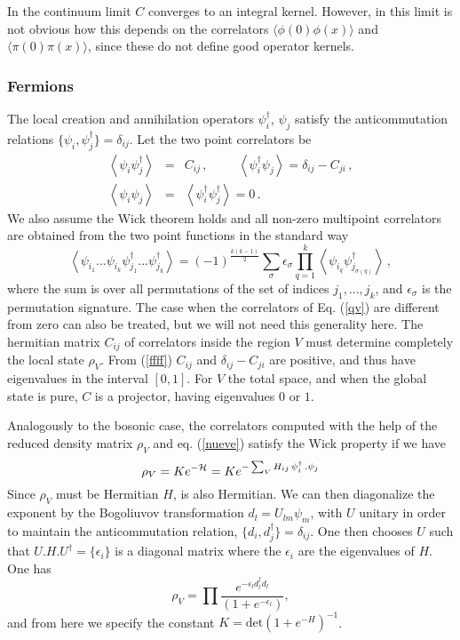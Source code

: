\documentclass[11pt]{article}
\begin{document}
In the continuum limit $C$ converges to an integral kernel. However, in this limit is not obvious how this depends on the correlators $\langle \phi(0) \phi(x)\rangle$ and $\langle \pi(0) \pi(x)\rangle$, since these do not define good operator kernels.    

\subsubsection{Fermions}
The local creation and annihilation operators $\psi_{i}^{\dagger }$, $\psi_{j}$
satisfy the anticommutation relations $
\{\psi_{i},\psi_{j}^{\dagger }\}=\delta
_{ij}$. 
 Let the two point correlators be
\begin{eqnarray}
\left< \psi_{i} \psi_{j}^\dagger
 \right> &=& C_{ij} \,,  \hspace{1cm}
\left< \psi_i^\dagger \psi_j \right> = \delta_{ij}- C_{ji} \,,\label{ffff}\\
\left< \psi_{i} \psi_{j}\right> &=& \left< \psi_{i}^\dagger \psi_{j}^\dagger\right>=0\,.\label{qv}
\end{eqnarray}
We also assume the Wick theorem holds and all non-zero multipoint correlators are obtained from the two point functions in the standard way
\begin{equation}
\left<\psi_{i_1}...\psi_{i_k}\psi^\dagger_{j_1}...\psi^\dagger_{j_k}\right>= (-1)^{\frac{k(k-1)}{2}}\sum_\sigma \epsilon_\sigma   \prod_{q=1}^k  \left< \psi_{i_q} \psi_{j_{\sigma(q)}}^\dagger
\right>\,,
\end{equation}
where the sum is over all permutations of the set of indices $j_1,..., j_k$, and $\epsilon_\sigma$ is the permutation signature. 
 The case when the correlators of Eq. (\ref{qv}) are different from zero can also be treated, but we will not need this generality here.   
The hermitian matrix $C_{ij}$ of correlators inside the region $V$ must determine completely the local state $\rho _{V}$. 
From (\ref{ffff}) $C_{ij}$ and $\delta_{ij}- C_{ji}$ are positive, and thus have eigenvalues in the interval $[0,1]$. For $V$ the total space, and when the global state is pure, $C$ is a projector, having eigenvalues $0$ or $1$. 
  
Analogously to the bosonic case, the correlators computed with the help of the reduced density matrix $\rho_V$ and eq. (\ref{nueve}) satisfy the Wick property if we have \cite{wick} 
  \begin{equation}
\rho _{V}=K e^{-{\cal H}}=K e^{-\sum_V H_{ij}\, \psi_{i}^\dagger\,. \psi_{j}}\label{corre}
\end{equation}
 Since $\rho_V$ must be Hermitian $H$, is also Hermitian. We can then diagonalize the exponent by the Bogoliuvov transformation
 $
d_{l}=U_{lm} \psi_m
$, 
with $U$ unitary in order to maintain the anticommutation relation, $\{d_i,d_j^\dagger\}=\delta_{ij}$.
One then chooses $U$ such that $U.H.U^\dagger=\{\epsilon_i \}$ is a diagonal matrix where the $\epsilon_i$ are the eigenvalues of $H$. One has
\begin{equation}
\rho _{V}=\prod \frac{e^{-\epsilon _{l}d_{l}^{\dagger }d_{l}}
}{\left( 1+e^{-\epsilon _{l}}\right) }, \label{diago}
\end{equation}
and from here we specify the constant $K=\textrm{det}(1+e^{-H})^{-1}$.
\end{document}
